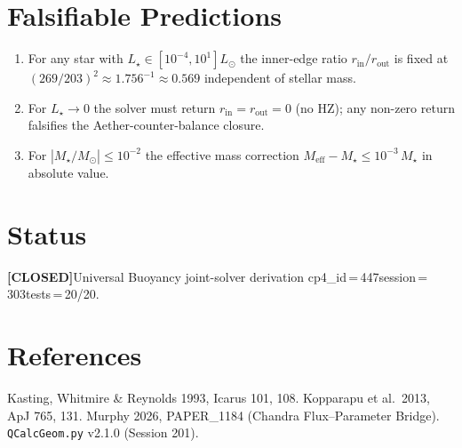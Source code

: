 \documentclass[11pt]{article}
\newcommand{\rin}{r_{\mathrm{in}}}
\newcommand{\rout}{r_{\mathrm{out}}}
\newcommand{\Meff}{M_{\mathrm{eff}}}
\newcommand{\Msun}{M_{\odot}}
\newcommand{\Lsun}{L_{\odot}}
\begin{document}
\section{Falsifiable Predictions}
\begin{enumerate}[leftmargin=2em]
\item For any star with $L_\star\in[10^{-4},10^{1}]\Lsun$ the inner-edge ratio
      $\rin/\rout$ is fixed at $(269/203)^{2}\approx 1.756^{-1}\!\approx\!0.569$
      independent of stellar mass.
\item For $L_\star\to 0$ the solver must return $\rin=\rout=0$ (no HZ); any
      non-zero return falsifies the Aether-counter-balance closure.
\item For $|M_\star/\Msun|\le 10^{-2}$ the effective mass correction
      $\Meff-M_\star \le 10^{-3}\,M_\star$ in absolute value.
\end{enumerate}

\section{Status}
\textbf{[CLOSED]}\quad Universal Buoyancy joint-solver derivation\quad
cp4\_id\,=\,447\quad session\,=\,303\quad tests\,=\,20/20.

\section{References}
Kasting, Whitmire \& Reynolds 1993, Icarus 101, 108.\quad
Kopparapu et al.\ 2013, ApJ 765, 131.\quad
Murphy 2026, PAPER\_1184 (Chandra Flux--Parameter Bridge).\quad
\texttt{QCalcGeom.py} v2.1.0 (Session 201).
\end{document}
